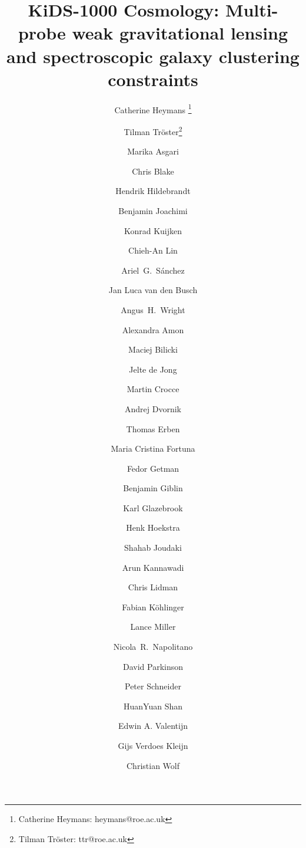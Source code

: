 \documentclass{aa}
\begin{document}
 

   \title{KiDS-1000 Cosmology: Multi-probe weak gravitational lensing and spectroscopic galaxy clustering constraints}

   \author{Catherine Heymans \thanks{Catherine Heymans: heymans@roe.ac.uk} 
   \and Tilman Tr\"oster\thanks{Tilman Tr\"oster: ttr@roe.ac.uk} 
   \and Marika Asgari 
   \and Chris Blake
   \and Hendrik Hildebrandt
   \and Benjamin Joachimi
   \and Konrad Kuijken
   \and Chieh-An Lin
   \and Ariel~G.~S\'anchez
   \and Jan Luca van den Busch
   \and Angus~H.~Wright
   \and Alexandra Amon
   \and Maciej Bilicki
   \and Jelte de Jong
   \and Martin Crocce
   \and Andrej Dvornik
   \and Thomas Erben
   \and Maria Cristina Fortuna
   \and Fedor Getman
   \and Benjamin Giblin
   \and Karl Glazebrook
   \and Henk Hoekstra
   \and Shahab Joudaki
   \and Arun Kannawadi
   \and Chris Lidman	
   \and Fabian K\"ohlinger
   \and Lance Miller
   \and Nicola~R.~Napolitano
   \and David Parkinson
   \and Peter Schneider 
   \and HuanYuan Shan
   \and Edwin A. Valentijn
   \and Gijs Verdoes Kleijn
   \and Christian Wolf 
          }
\end{document}
